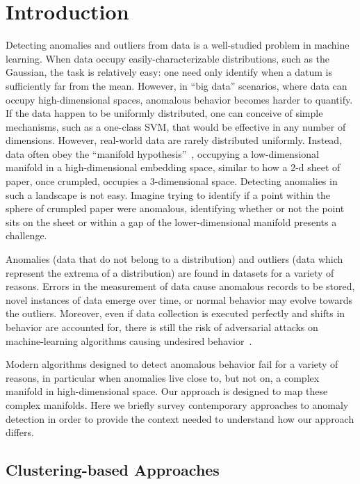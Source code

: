 \section{Introduction}
\label{sec:introduction}

Detecting anomalies and outliers from data is a well-studied problem in machine learning.
When data occupy easily-characterizable distributions, such as the Gaussian, the task is relatively easy:
one need only identify when a datum is sufficiently far from the mean.
However, in ``big data'' scenarios, where data can occupy high-dimensional spaces, anomalous behavior becomes harder to quantify.
If the data happen to be uniformly distributed, one can conceive of simple mechanisms, such as a one-class SVM, that would be effective in any number of dimensions.
However, real-world data are rarely distributed uniformly.
Instead, data often obey the ``manifold hypothesis''~\cite{fefferman2016testing}, occupying a low-dimensional manifold in a high-dimensional embedding space, similar to how a 2-d sheet of paper, once crumpled, occupies a 3-dimensional space.
Detecting anomalies in such a landscape is not easy.
Imagine trying to identify if a point within the sphere of crumpled paper were anomalous, identifying whether or not the point sits on the sheet or within a gap of the lower-dimensional manifold presents a challenge.

Anomalies (data that do not belong to a distribution) and outliers (data which represent the extrema of a distribution) are found in datasets for a variety of reasons.
Errors in the measurement of data cause anomalous records to be stored,
novel instances of data emerge over time,
or normal behavior may evolve towards the outliers.
Moreover, even if data collection is executed perfectly and shifts in behavior are accounted for, there is still the risk of adversarial attacks on machine-learning algorithms causing undesired behavior~\cite{elsayed2018adversarial}.

Modern algorithms designed to detect anomalous behavior fail for a variety of reasons, in particular when anomalies live close to, but not on, a complex manifold in high-dimensional space.
Our approach is designed to map these complex manifolds.
Here we briefly survey contemporary approaches to anomaly detection in order to provide the context needed to understand how our approach differs.

\subsection{Clustering-based Approaches}
\label{subsec:introduction:clustering-based-approaches}

